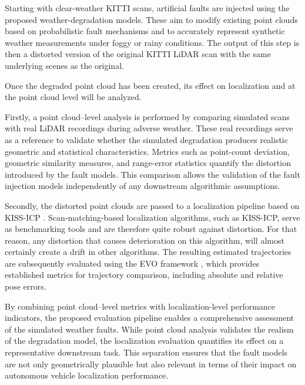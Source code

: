 Starting with clear-weather KITTI scans, artificial faults are injected using the proposed weather-degradation models. These aim to modify existing point clouds based on probabilistic fault mechanisms and to accurately represent synthetic weather measurements under foggy or rainy conditions. The output of this step is then a distorted version of the original KITTI LiDAR scan with the same underlying scenes as the original. 

Once the degraded point cloud has been created, its effect on localization and at the point cloud level will be analyzed. 

Firstly, a point cloud–level analysis is performed by comparing simulated scans with real LiDAR recordings during adverse weather. 
These real recordings serve as a reference to validate whether the simulated degradation produces realistic geometric and statistical characteristics. 
Metrics such as point-count deviation, geometric similarity measures, and range-error statistics quantify the distortion introduced by the fault models. 
This comparison allows the validation of the fault injection models independently of any downstream algorithmic assumptions.  %

Secondly, the distorted point clouds are passed to a localization pipeline based on KISS-ICP \cite{vizzo_kiss-icp_2023}. 
Scan-matching-based localization algorithms, such as KISS-ICP, serve as benchmarking tools and are therefore quite robust against distortion. For that reason, any distortion that causes deterioration on this algorithm, will almost certainly create a drift in other algorithms. 
The resulting estimated trajectories are subsequently evaluated using the EVO framework \cite{grupp_michaelgruppevo_2026}, which provides established metrics for trajectory comparison, including absolute and relative pose errors.

By combining point cloud–level metrics with localization-level performance indicators, the proposed evaluation pipeline enables a comprehensive assessment of the simulated weather faults. 
While point cloud analysis validates the realism of the degradation model, the localization evaluation quantifies its effect on a representative downstream task. 
This separation ensures that the fault models are not only geometrically plausible but also relevant in terms of their impact on autonomous vehicle localization performance.

